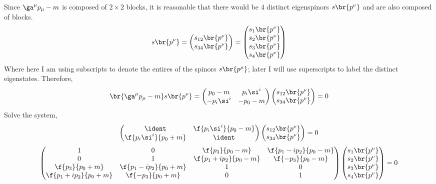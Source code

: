\documentclass{article}
\begin{document}
Since $\ga^{\mu} p_{\mu} - m$ is composed of $2 \times 2$ blocks, it is reasonable that there would be $4$ distinct eigenspinors $s\br{p^{\nu}}$ and are also composed of blocks.
\[ s\br{p^{\nu}} = \begin{pmatrix}
    s_{12}\br{p^{\nu}} \\
    s_{34}\br{p^{\nu}} \\
\end{pmatrix} = \begin{pmatrix}
    s_{1}\br{p^{\nu}} \\
    s_{2}\br{p^{\nu}} \\
    s_{3}\br{p^{\nu}} \\
    s_{4}\br{p^{\nu}} \\
\end{pmatrix} \]
Where here I am using subscripts to denote the entires of the spinors $s\br{p^{\mu}}$; later I will use superscripts to label the distinct eigenstates. Therefore,
\[ \br{\ga^{\mu} p_{\mu} - m}s\br{p^{\nu}} = \begin{pmatrix}
    p_0 - m & p_i\si^{i} \\
    -p_i\si^{i} & - p_0 - m \\
\end{pmatrix}\begin{pmatrix}
    s_{12}\br{p^{\nu}} \\
    s_{34}\br{p^{\nu}} \\
\end{pmatrix} = 0 \]
Solve the system,
\[ \begin{pmatrix}
    \ident & \f{p_i\si^{i}}{p_0 - m} \\
    \f{p_i\si^{i}}{p_0 + m} & \ident \\
\end{pmatrix}\begin{pmatrix}
    s_{12}\br{p^{\nu}} \\
    s_{34}\br{p^{\nu}} \\
\end{pmatrix} = 0 \]
\[ \begin{pmatrix}
    1 & 0 & \f{p_3}{p_0 - m} & \f{p_1 - i p_2}{p_0 - m} \\
    0 & 1 & \f{p_1 + i p_2}{p_0 - m} & \f{-p_3}{p_0 - m} \\
    \f{p_3}{p_0 + m} & \f{p_1 - i p_2}{p_0 + m} & 1 & 0 \\
    \f{p_1 + i p_2}{p_0 + m} & \f{-p_3}{p_0 + m} & 0 & 1 \\
\end{pmatrix}\begin{pmatrix}
    s_{1}\br{p^{\nu}} \\
    s_{2}\br{p^{\nu}} \\
    s_{3}\br{p^{\nu}} \\
    s_{4}\br{p^{\nu}} \\
\end{pmatrix} = 0 \]
\end{document}
